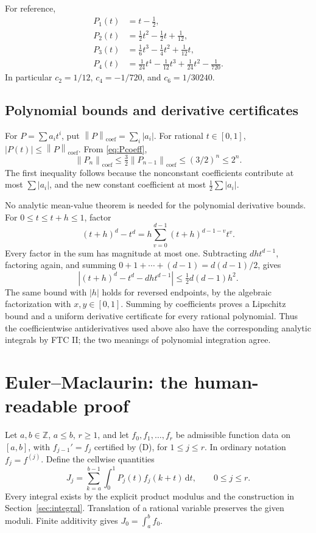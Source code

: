 \documentclass[11pt]{article}
\theoremstyle{definition}
\newcommand{\Z}{\mathbb Z}
\newcommand{\abs}[1]{\left|#1\right|}
\newcommand{\normc}[1]{\left\|#1\right\|_{\mathrm{coef}}}
\newcommand{\dd}{\,\mathrm{d}}
\begin{document}
For reference,
\begin{align*}
 P_1(t)&=t-\tfrac12,\\
 P_2(t)&=\tfrac12t^2-\tfrac12t+\tfrac1{12},\\
 P_3(t)&=\tfrac16t^3-\tfrac14t^2+\tfrac1{12}t,\\
 P_4(t)&=\tfrac1{24}t^4-\tfrac1{12}t^3+\tfrac1{24}t^2-\tfrac1{720}.
\end{align*}
In particular \(c_2=1/12\), \(c_4=-1/720\), and \(c_6=1/30240\).

\subsection{Polynomial bounds and derivative certificates}

For \(P=\sum a_it^i\), put \(\normc P=\sum_i\abs{a_i}\).
For rational \(t\in[0,1]\),
\(\abs{P(t)}\le\normc P\).  From \eqref{eq:Pcoeff},
\begin{equation}
 \normc{P_n}\le\tfrac32\normc{P_{n-1}}
 \le(3/2)^n\le2^n.\label{eq:coefbound}
\end{equation}
The first inequality follows because the nonconstant coefficients
contribute at most \(\sum\abs{a_i}\), and the new constant coefficient
at most \(\tfrac12\sum\abs{a_i}\).

No analytic mean-value theorem is needed for the polynomial derivative
bounds.  For \(0\le t\le t+h\le1\), factor
\[
 (t+h)^d-t^d=h\sum_{v=0}^{d-1}(t+h)^{d-1-v}t^v.
\]
Every factor in the sum has magnitude at most one.  Subtracting
\(dh t^{d-1}\), factoring again, and summing
\(0+1+\cdots+(d-1)=d(d-1)/2\), gives
\begin{equation}
 \abs{(t+h)^d-t^d-dht^{d-1}}
 \le\tfrac12d(d-1)h^2.\label{eq:monomialremainder}
\end{equation}
The same bound with \(\abs h\) holds for reversed endpoints, by
the algebraic factorization with \(x,y\in[0,1]\).  Summing by
coefficients proves a Lipschitz bound and a uniform derivative
certificate for every rational polynomial.  Thus the coefficientwise
antiderivatives used above also have the corresponding analytic
integrals by FTC II; the two meanings of polynomial integration agree.

\section{Euler--Maclaurin: the human-readable proof}\label{sec:EM}

Let \(a,b\in\Z\), \(a\le b\), \(r\ge1\), and let
\(f_0,f_1,\ldots,f_r\) be admissible function data on \([a,b]\), with
\(f_{j-1}'=f_j\) certified by (D), for \(1\le j\le r\).
In ordinary notation \(f_j=f^{(j)}\).  Define the cellwise quantities
\begin{equation}
 J_j=\sum_{k=a}^{b-1}\int_0^1P_j(t)f_j(k+t)\dd t,
 \qquad 0\le j\le r.\label{eq:Jdef}
\end{equation}
Every integral exists by the explicit product modulus and the
construction in Section~\ref{sec:integral}.  Translation of a rational
variable preserves the given moduli.  Finite additivity gives
\(J_0=\int_a^b f_0\).
\end{document}
